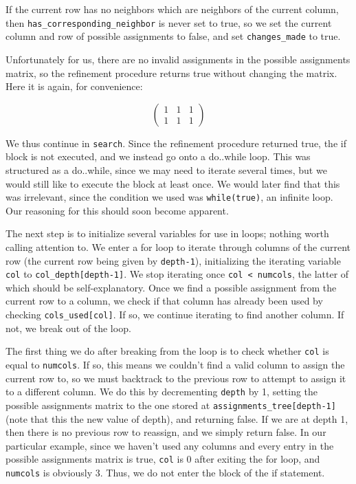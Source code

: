 \documentclass{article}
\begin{document}
  If the current row has no neighbors which are neighbors of the current column, then \texttt{has\_corresponding\_neighbor} is never set to true, so we set the current column and row of possible assignments to false, and set \texttt{changes\_made} to true.

  Unfortunately for us, there are no invalid assignments in the possible assignments matrix, so the refinement procedure returns true without changing the matrix. Here it is again, for convenience:

  \[ \begin{pmatrix}
      1 & 1 & 1 \\
      1 & 1 & 1
  \end{pmatrix} \]

  We thus continue in \texttt{search}. Since the refinement procedure returned true, the if block is not executed, and we instead go onto a do..while loop. This was structured as a do..while, since we may need to iterate several times, but we would still like to execute the block at least once. We would later find that this was irrelevant, since the condition we used was \texttt{while(true)}, an infinite loop. Our reasoning for this should soon become apparent. 
  
  The next step is to initialize several variables for use in loops; nothing worth calling attention to. We enter a for loop to iterate through columns of the current row (the current row being given by \texttt{depth-1}), initializing the iterating variable \texttt{col} to \texttt{col\_depth[depth-1]}. We stop iterating once \texttt{col < numcols}, the latter of which should be self-explanatory. Once we find a possible assignment from the current row to a column, we check if that column has already been used by checking \texttt{cols\_used[col]}. If so, we continue iterating to find another column. If not, we break out of the loop.

  The first thing we do after breaking from the loop is to check whether \texttt{col} is equal to \texttt{numcols}. If so, this means we couldn't find a valid column to assign the current row to, so we must backtrack to the previous row to attempt to assign it to a different column. We do this by decrementing \texttt{depth} by 1, setting the possible assignments matrix to the one stored at \texttt{assignments\_tree[depth-1]} (note that this the new value of depth), and returning false. If we are at depth 1, then there is no previous row to reassign, and we simply return false. In our particular example, since we haven't used any columns and every entry in the possible assignments matrix is true, \texttt{col} is 0 after exiting the for loop, and \texttt{numcols} is obviously 3. Thus, we do not enter the block of the if statement.
\end{document}
